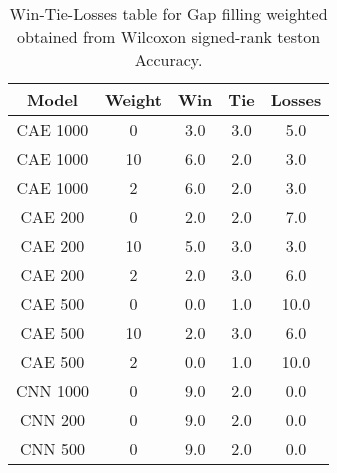 \begin{table}[H]
\centering
\begin{tabular}{|c|c|c|c|c|}

\textbf{Model} & \textbf{Weight} &  \textbf{Win} &  \textbf{Tie} &  \textbf{Losses} \\
\hline

      CAE 1000 &               0 &           3.0 &           3.0 &              5.0 \\
\hline
      CAE 1000 &              10 &           6.0 &           2.0 &              3.0 \\
\hline
      CAE 1000 &               2 &           6.0 &           2.0 &              3.0 \\
\hline
       CAE 200 &               0 &           2.0 &           2.0 &              7.0 \\
\hline
       CAE 200 &              10 &           5.0 &           3.0 &              3.0 \\
\hline
       CAE 200 &               2 &           2.0 &           3.0 &              6.0 \\
\hline
       CAE 500 &               0 &           0.0 &           1.0 &             10.0 \\
\hline
       CAE 500 &              10 &           2.0 &           3.0 &              6.0 \\
\hline
       CAE 500 &               2 &           0.0 &           1.0 &             10.0 \\
\hline
      CNN 1000 &               0 &           9.0 &           2.0 &              0.0 \\
\hline
       CNN 200 &               0 &           9.0 &           2.0 &              0.0 \\
\hline
       CNN 500 &               0 &           9.0 &           2.0 &              0.0 \\
\hline

\end{tabular}
\caption{Win-Tie-Losses table for Gap filling weighted obtained from Wilcoxon signed-rank teston Accuracy.}
\label{tab:gap_filling_weighted_weighted_comparison_all}
\end{table}